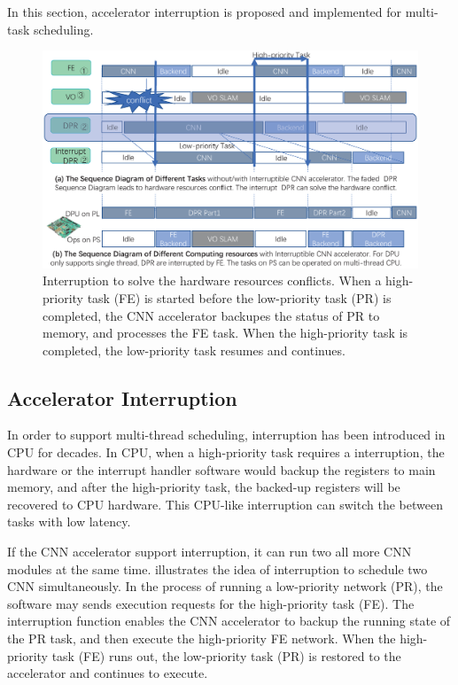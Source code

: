 \label{sec:cnninterrupt}

In this section, accelerator interruption is proposed and implemented for multi-task scheduling.


\begin{figure}
	\centering
	\includegraphics[width=0.99\linewidth]{fig/interDPR.eps}
	\caption{Interruption to solve the hardware resources conflicts.  When a high-priority task (FE) is started before the low-priority task (PR) is completed, the CNN accelerator backupes the status of PR to memory, and processes the FE task. When the high-priority task is completed, the low-priority task resumes and continues.
    }
	\label{fig:interDPR}
\end{figure}

\subsection{Accelerator Interruption}

In order to support multi-thread scheduling, interruption has been introduced in CPU for decades. In CPU, when a high-priority task requires a interruption, the hardware or the interrupt handler software would backup the registers to main memory, and after the high-priority task, the backed-up registers will be recovered to CPU hardware. This CPU-like interruption can switch the between tasks with low latency.

If the CNN accelerator support interruption, it can run two all more CNN modules at the same time.  illustrates the idea of interruption to schedule two CNN simultaneously. In the process of running a low-priority network (PR), the software may sends execution requests for the high-priority task (FE). The interruption function enables the CNN accelerator to backup the running state of the PR task, and then execute the high-priority FE network. When the high-priority task (FE) runs out, the low-priority task (PR) is restored to the accelerator and continues to execute.

